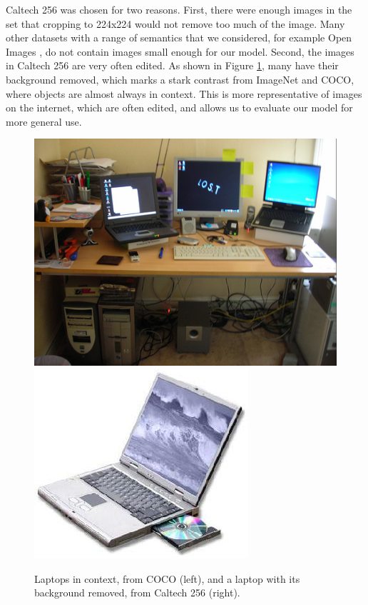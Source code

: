 \documentclass{article} %
\begin{document}
Caltech 256 was chosen for two reasons. First, there were enough images in the set that cropping to 224x224 would not remove too much of the image. Many other datasets with a range of semantics that we considered, for example Open Images \citep{Kuznetsova_2020}, do not contain images small enough for our model. Second, the images in Caltech 256 are very often edited. As shown in Figure \ref{fig:coco_vs_caltech}, many have their background removed, which marks a stark contrast from ImageNet and COCO, where objects are almost always in context. This is more representative of images on the internet, which are often edited, and allows us to evaluate our model for more general use.

\begin{figure}[h]
    \begin{center}
        \includegraphics[scale=0.3]{figs/coco_laptop.jpg}
        \includegraphics[scale=0.45]{figs/caltech_laptop.jpg}
    \end{center}
    \caption{Laptops in context, from COCO (left), and a laptop with its background removed, from Caltech 256 (right).}
    \label{fig:coco_vs_caltech}
\end{figure}
\end{document}
